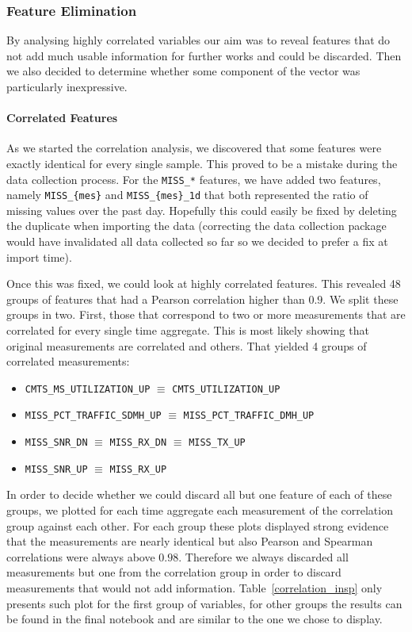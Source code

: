 \subsubsection{Feature Elimination}
By analysing highly correlated variables our aim was to reveal features that do not add much usable information for further works and could be discarded. Then we also decided to determine whether some component of the vector was particularly inexpressive. 
 
\paragraph{Correlated Features}
As we started the correlation analysis, we discovered that some features were exactly identical for every single sample. This proved to be a mistake during the data collection process. For the \texttt{MISS\_*} features, we have added two features, namely \texttt{MISS\_\{mes\}} and \texttt{MISS\_\{mes\}\_1d} that both represented the ratio of missing values over the past day. Hopefully this could easily be fixed by deleting the duplicate when importing the data (correcting the data collection package would have invalidated all data collected so far so we decided to prefer a fix at import time).

Once this was fixed, we could look at highly correlated features. This revealed 48 groups of features that had a Pearson correlation higher than $0.9$. We split these groups in two. First, those that correspond to two or more measurements that are correlated for every single time aggregate. This is most likely showing that original measurements are correlated and others. That yielded 4 groups of correlated measurements:
\begin{itemize}[noitemsep,topsep=0pt]
	\item \texttt{CMTS\_MS\_UTILIZATION\_UP} $\equiv$ \texttt{CMTS\_UTILIZATION\_UP}
	\item \texttt{MISS\_PCT\_TRAFFIC\_SDMH\_UP}  $\equiv$ \texttt{MISS\_PCT\_TRAFFIC\_DMH\_UP}
	\item \texttt{MISS\_SNR\_DN}  $\equiv$ \texttt{MISS\_RX\_DN}  $\equiv$ \texttt{MISS\_TX\_UP}
	\item \texttt{MISS\_SNR\_UP}  $\equiv$ \texttt{MISS\_RX\_UP}
\end{itemize}
In order to decide whether we could discard all but one feature of each of these groups, we plotted for each time aggregate each measurement of the correlation group against each other. For each group these plots displayed strong evidence that the measurements are nearly identical but also Pearson and Spearman correlations were always above $0.98$. Therefore we always discarded all measurements but one from the correlation group in order to discard measurements that would not add information. Table~\ref{correlation_insp} only presents such plot for the first group of variables, for other groups the results can be found in the final notebook and are similar to the one we chose to display.

